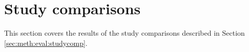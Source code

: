 \section{Study comparisons}
\label{sec:res:studycomp}
This section covers the results of the study comparisons described in Section \ref{sec:meth:eval:studycomp}. 


